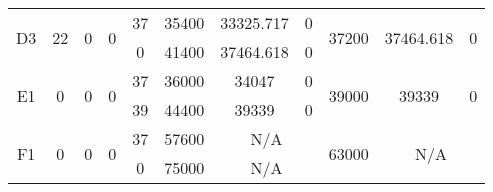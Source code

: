 \begin{sidewaystable}
\begin{tabular}{c||c|c|c||c|c|c|c||c|c|c}
         &
        
      \\
      \hline
      \multirow{2}{*}{D3} &
      \multirow{2}{*}{22} &
      \multirow{2}{*}{0} &
      \multirow{2}{*}{0} &
      37 &
      35400 &
        33325.717 &
        0 &
      \multirow{2}{*}{37200} &
        \multirow{2}{*}{37464.618} &
        \multirow{2}{*}{0}
      \\
      \cline{5-8}
       &
       &
       &
       &
      0 &
      41400 &
        37464.618 &
        0 &
      
         &
        
      \\
      \hline
      \multirow{2}{*}{E1} &
      \multirow{2}{*}{0} &
      \multirow{2}{*}{0} &
      \multirow{2}{*}{0} &
      37 &
      36000 &
        34047 &
        0 &
      \multirow{2}{*}{39000} &
        \multirow{2}{*}{39339} &
        \multirow{2}{*}{0}
      \\
      \cline{5-8}
       &
       &
       &
       &
      39 &
      44400 &
        39339 &
        0 &
      
         &
        
      \\
      \hline
      \multirow{2}{*}{F1} &
      \multirow{2}{*}{0} &
      \multirow{2}{*}{0} &
      \multirow{2}{*}{0} &
      37 &
      57600 &
        \multicolumn{2}{|c||}{N/A} &
      \multirow{2}{*}{63000} &
        \multicolumn{2}{c}{\multirow{2}{*}{N/A}}
      \\
      \cline{5-8}
       &
       &
       &
       &
      0 &
      75000 &
        \multicolumn{2}{|c||}{N/A} &
      
        
      \\
\end{tabular}
\label{table:RASDATASET1} 
\end{sidewaystable}
